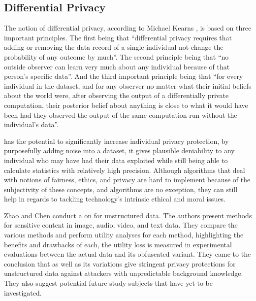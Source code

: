 \subsection{Differential Privacy}\label{subsection:differential_privacy}

The notion of differential privacy, according to Michael Kearns \cite{kearns2019ethical},
is based on three important principles. The first being that ``differential
privacy requires that adding or removing the data record of a single individual
not change the probability of any outcome by much''. The second principle
being that ``no outside observer can learn very much about any individual
because of that person's specific data''. And the third important principle
being that ``for every individual in the dataset, and for any observer no
matter what their initial beliefs about the world were, after observing
the output of a differentially private computation, their posterior belief
about anything is close to what it would have been had they observed the
output of the same computation run without the individual's data''.

\hyperlink{\acronym}{\acronym} has the potential to significantly increase individual
privacy protection, by purposefully adding noise into a dataset, it gives
plausible deniability to any individual who may have had their data exploited
while still being able to calculate statistics with relatively high precision.
Although algorithms that deal with notions of fairness, ethics, and privacy
are hard to implement because of the subjectivity of these concepts, and
\hyperlink{\acronym}{\acronym} algorithms are no exception, they can still help in
regards to tackling technology's intrinsic ethical and moral issues.

Zhao and Chen \cite{ZhaoSurvey} conduct a \hyperlink{\acronym}{\acronym} on \hyperlink{\acronym}{\acronym} for
unstructured data. The authors present \hyperlink{\acronym}{\acronym} methods for
sensitive content in image, audio, video, and text data. They compare the
various methods and perform utility analyses for each method, highlighting
the benefits and drawbacks of each, the utility loss is measured in experimental
evaluations between the actual data and its obfuscated variant. They came
to the conclusion that \hyperlink{\acronym}{\acronym} as well as its variations give
stringent privacy protections for unstructured data against attackers with
unpredictable background knowledge. They also suggest potential future study
subjects that have yet to be investigated.

